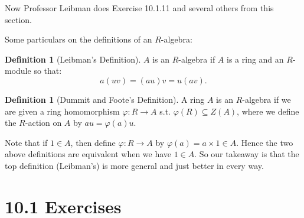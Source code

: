 \documentclass[9pt,reqno,twoside]{amsbook}
\theoremstyle{plain}
\numberwithin{section}{chapter}
\numberwithin{equation}{chapter}
\theoremstyle{definition}
\newtheorem{Def}[theorem]{Definition}
\theoremstyle{remark}
\theoremstyle{plain}
\newcommand{\sub}{\subseteq}
\renewcommand{\phi}{\varphi}
\begin{document}
Now Professor Leibman does Exercise 10.1.11 and several others from this section. 

Some particulars on the definitions of an $R$-algebra:

\begin{Def}[Leibman's Definition]
$A$ is an $R$-algebra if $A$ is a ring and an $R$-module so that:
$$
a(uv) = (au)v = u(av).
$$
\end{Def}

\begin{Def}[Dummit and Foote's Definition]
A ring $A$ is an $R$-algebra if we are given a ring homomorphism $\phi:R \to A$ s.t. $\phi(R) \sub Z(A)$, where we define the $R$-action on $A$ by $au = \phi(a)u$. 
\end{Def}

Note that if $1 \in A$, then define $\phi:R \to A$ by $\phi(a) = a \times 1 \in A$. Hence the two above definitions are equivalent when we have $1 \in A$. So our takeaway is that the top definition (Leibman's) is more general and just better in every way. 



\section*{10.1 Exercises}
\end{document}
